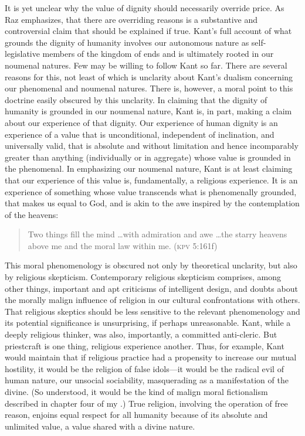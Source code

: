 \documentclass[12pt]{article}
\begin{document}
It is yet unclear why the value of dignity should necessarily override price. As Raz emphasizes, that there are overriding reasons is a substantive and controversial claim that should be explained if true. Kant's full account of what grounds the dignity of humanity involves our autonomous nature as self-le\-gis\-la\-tive members of the kingdom of ends and is ultimately rooted in our noumenal natures. Few may be willing to follow Kant so far. There are several reasons for this, not least of which is unclarity about Kant's dualism concerning our phenomenal and noumenal natures. There is, however, a moral point to this doctrine easily obscured by this unclarity. In claiming that the dignity of humanity is grounded in our noumenal nature, Kant is, in part, making a claim about our experience of that dignity. Our experience of human dignity is an experience of a value that is unconditional, independent of inclination, and universally valid, that is absolute and without limitation and hence incomparably greater than anything (individually or in aggregate) whose value is grounded in the phenomenal. In emphasizing our noumenal nature, Kant is at least claiming that our experience of this value is, fundamentally, a religious experience. It is an experience of something whose value transcends what is phenomenally grounded, that makes us equal to God, and is akin to the awe inspired by the contemplation of the heavens: 
\begin{quote}
	Two things fill the mind \ldots with admiration and awe \ldots the starry heavens above me and the moral law within me. (\textsc{kpv} 5:161f) 
\end{quote}

This moral phenomenology is obscured not only by theoretical unclarity, but also by religious skepticism. Contemporary religious skepticism comprises, among other things, important and apt criticisms of intelligent design, and doubts about the morally malign influence of religion in our cultural confrontations with others. That religious skeptics should be less sensitive to the relevant phenomenology and its potential significance is unsurprising, if perhaps unreasonable. Kant, while a deeply religious thinker, was also, importantly, a committed anti-cleric. But priestcraft is one thing, religious experience another. Thus, for example, Kant would maintain that if religious practice had a propensity to increase our mutual hostility, it would be the religion of false idols---it would be the radical evil of human nature, our unsocial sociability, masquerading as a manifestation of the divine. (So understood, it would be the kind of malign moral fictionalism described in chapter four of my \citeyear{Kalderon:2005gz}.) True religion, involving the operation of free reason, enjoins equal respect for all humanity because of its absolute and unlimited value, a value shared with a divine nature.
\end{document}
